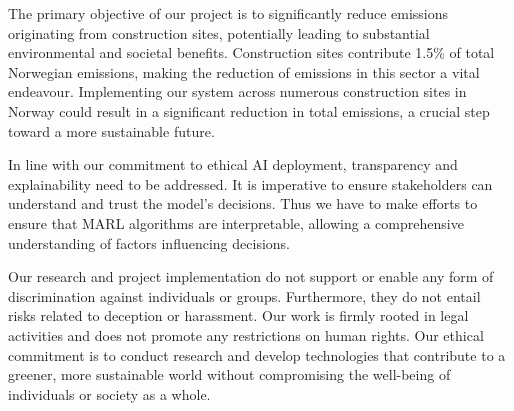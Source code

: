 \documentclass[conference]{IEEEtran}
\begin{document}

	The primary objective of our project is to significantly reduce \coo{} emissions originating from
	construction sites, potentially leading to substantial environmental and societal benefits.
	Construction sites contribute 1.5\% of total Norwegian \coo{} emissions, making the reduction of
	emissions in this sector a vital endeavour. Implementing our system across numerous construction sites
	in Norway could result in a significant reduction in total \coo{} emissions, a crucial step toward a more
	sustainable future.

	In line with our commitment to ethical AI deployment, transparency and explainability need to be
	addressed. It is imperative to ensure stakeholders can understand and trust the model's decisions.
	Thus we have to make efforts to ensure that MARL algorithms are interpretable, allowing a comprehensive
	understanding of factors influencing decisions.

	Our research and project implementation do not support or enable any form of discrimination against
	individuals or groups. Furthermore, they do not entail risks related to deception or harassment.
	Our work is firmly rooted in legal activities and does not promote any restrictions on human rights.
	Our ethical commitment is to conduct research and develop technologies that contribute to a greener,
	more sustainable world without compromising the well-being of individuals or society as a whole.

	\newpage


	\nocite{*}        %
	
	
\end{document}
